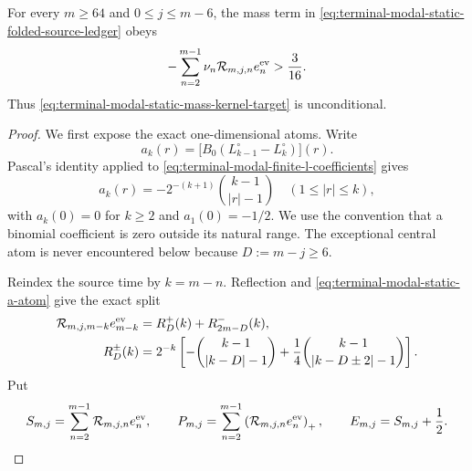 \begin{lemma}
\label{lem:terminal-modal-static-mass-kernel}
For every $m\ge64$ and $0\le j\le m-6$, the mass term in
\eqref{eq:terminal-modal-static-folded-source-ledger} obeys
\begin{equation}
 -\sum_{n=2}^{m-1}\nu_n
  \mathcal R_{m,j,n}e_n^{\rm ev}>\frac3{16}.
 \label{eq:terminal-modal-static-mass-kernel}
\end{equation}
Thus \eqref{eq:terminal-modal-static-mass-kernel-target} is unconditional.
\end{lemma}

\begin{proof}
We first expose the exact one-dimensional atoms.  Write
\[
 a_k(r)=\bigl[B_0(L_{k-1}^\circ-L_k^\circ)\bigr](r).
\]
Pascal's identity applied to
\eqref{eq:terminal-modal-finite-l-coefficients} gives
\begin{equation}
 a_k(r)=-2^{-(k+1)}\binom{k-1}{|r|-1}
 \quad(1\le |r|\le k),
 \label{eq:terminal-modal-static-a-atom}
\end{equation}
with $a_k(0)=0$ for $k\ge2$ and $a_1(0)=-1/2$.  We use the convention that a
binomial coefficient is zero outside its natural range.  The exceptional
central atom is never encountered below because $D:=m-j\ge6$.

Reindex the source time by $k=m-n$.  Reflection and
\eqref{eq:terminal-modal-static-a-atom} give the exact split
\begin{align}
 \mathcal R_{m,j,m-k}e_{m-k}^{\rm ev}
 &=R_D^+(k)+R_{2m-D}^-(k),
 \label{eq:terminal-modal-static-R-split}\\
 R_D^\pm(k)
 &=2^{-k}\left[
 -\binom{k-1}{|k-D|-1}
 +\frac14\binom{k-1}{|k-D\pm2|-1}
 \right].
 \label{eq:terminal-modal-static-R-atoms}
\end{align}
Put
\[
 S_{m,j}=\sum_{n=2}^{m-1}\mathcal R_{m,j,n}e_n^{\rm ev},
 \qquad
 P_{m,j}=\sum_{n=2}^{m-1}
 \left(\mathcal R_{m,j,n}e_n^{\rm ev}\right)_+,
 \qquad
 E_{m,j}=S_{m,j}+\frac12.
\]


\end{proof}
